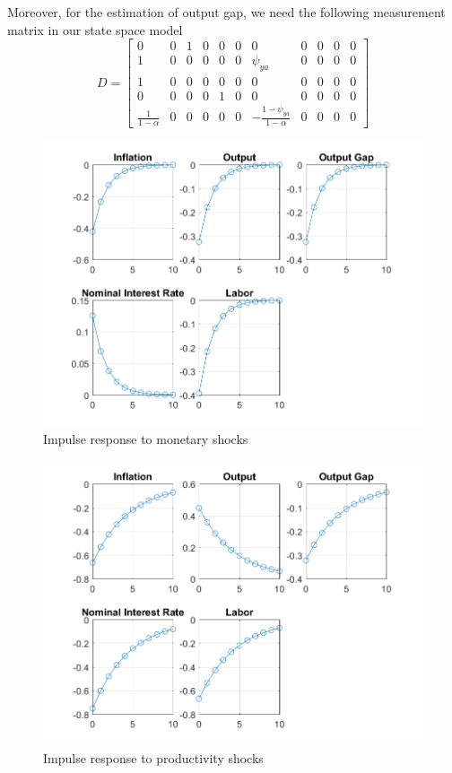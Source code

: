 \documentclass[12pt]{article}
\theoremstyle{definition}
\newcommand{\bra}[1]{\left[#1\right]}
\newcommand{\mat}[1]{\begin{matrix}#1\end{matrix}}
\newcommand{\bmat}[1]{\bra{\mat{#1}}}
\begin{document}
Moreover, for the estimation of output gap, we need the following measurement matrix in our state space model
\[
D = \bmat{0& 0&1 &0& 0& 0& 0& 0& 0& 0& 0\\
	1& 0& 0& 0& 0& 0& \psi_{ya}& 0& 0& 0& 0\\
	1& 0& 0& 0& 0& 0& 0& 0& 0& 0& 0\\
	0& 0& 0& 0& 1& 0& 0& 0& 0& 0& 0\\
	\frac{1}{1-\alpha}& 0& 0& 0& 0& 0& -\frac{1-\psi_{ya}}{1-\alpha}& 0& 0& 0& 0}
\]
\begin{figure}[H]
	\centering
	\includegraphics[width=\linewidth, height=0.4\textheight]{impulse_monetary}
	\caption{Impulse response to monetary shocks}
	\label{fig:impulse_monetary}
\end{figure}
\begin{figure}[H]
	\centering
	\includegraphics[width=\linewidth, height=0.4\textheight]{impulse_prod}
	\caption{Impulse response to productivity shocks}
	\label{fig:impulse_prod}
\end{figure}
\end{document}
